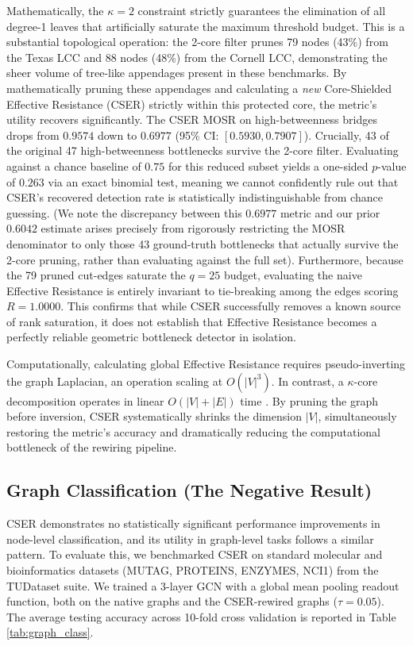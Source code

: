 \documentclass[10pt]{article} %
\begin{document}
Mathematically, the $\kappa = 2$ constraint strictly guarantees the elimination of all degree-1 leaves that artificially saturate the maximum threshold budget. This is a substantial topological operation: the 2-core filter prunes 79 nodes (43\%) from the Texas LCC and 88 nodes (48\%) from the Cornell LCC, demonstrating the sheer volume of tree-like appendages present in these benchmarks. By mathematically pruning these appendages and calculating a \textit{new} Core-Shielded Effective Resistance (CSER) strictly within this protected core, the metric's utility recovers significantly. The CSER MOSR on high-betweenness bridges drops from $0.9574$ down to $0.6977$ (95\% CI: $[0.5930, 0.7907]$). Crucially, 43 of the original 47 high-betweenness bottlenecks survive the 2-core filter. Evaluating against a chance baseline of $0.75$ for this reduced subset yields a one-sided $p$-value of $0.263$ via an exact binomial test, meaning we cannot confidently rule out that CSER's recovered detection rate is statistically indistinguishable from chance guessing. (We note the discrepancy between this $0.6977$ metric and our prior $0.6042$ estimate arises precisely from rigorously restricting the MOSR denominator to only those 43 ground-truth bottlenecks that actually survive the 2-core pruning, rather than evaluating against the full set). Furthermore, because the 79 pruned cut-edges saturate the $q=25$ budget, evaluating the naive Effective Resistance is entirely invariant to tie-breaking among the edges scoring $R=1.0000$. This confirms that while CSER successfully removes a known source of rank saturation, it does not establish that Effective Resistance becomes a perfectly reliable geometric bottleneck detector in isolation.

Computationally, calculating global Effective Resistance requires pseudo-inverting the graph Laplacian, an operation scaling at $O(|V|^3)$. In contrast, a $\kappa$-core decomposition operates in linear $O(|V| + |E|)$ time \citep{Batagelj2003}. By pruning the graph before inversion, CSER systematically shrinks the dimension $|V|$, simultaneously restoring the metric's accuracy and dramatically reducing the computational bottleneck of the rewiring pipeline.

\subsection{Graph Classification (The Negative Result)}
CSER demonstrates no statistically significant performance improvements in node-level classification, and its utility in graph-level tasks follows a similar pattern. To evaluate this, we benchmarked CSER on standard molecular and bioinformatics datasets (MUTAG, PROTEINS, ENZYMES, NCI1) from the TUDataset suite. We trained a 3-layer GCN with a global mean pooling readout function, both on the native graphs and the CSER-rewired graphs ($\tau=0.05$). The average testing accuracy across 10-fold cross validation is reported in Table \ref{tab:graph_class}.
\end{document}
